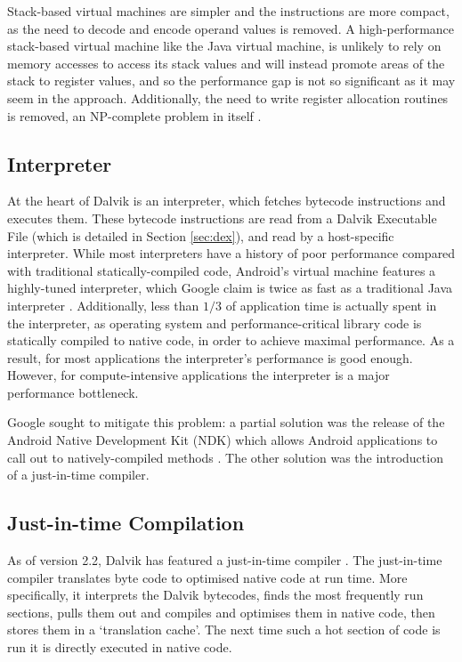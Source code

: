 Stack-based virtual machines are simpler and the instructions are more compact, as the need to decode and encode operand values is removed. A high-performance stack-based virtual machine like the Java virtual machine, is unlikely to rely on memory accesses to access its stack values and will instead promote areas of the stack to register values, and so the performance gap is not so significant as it may seem in the \naive approach. Additionally, the need to write register allocation routines is removed, an NP-complete problem in itself \cite{chaitin82}.

\subsection*{Interpreter}

At the heart of Dalvik is an interpreter, which fetches bytecode instructions and executes them. These bytecode instructions are read from a Dalvik Executable File (which is detailed in Section \ref{sec:dex}), and read by a host-specific interpreter. While most interpreters have a history of poor performance compared with traditional statically-compiled code, Android's virtual machine features a highly-tuned interpreter, which Google claim is twice as fast as a traditional Java interpreter \cite{android_22}. Additionally, less than $1/3$ of application time is actually spent in the interpreter, as operating system and performance-critical library code is statically compiled to native code, in order to achieve maximal performance. As a result, for most applications the interpreter's performance is good enough. However, for compute-intensive applications the interpreter is a major performance bottleneck.

Google sought to mitigate this problem: a partial solution was the release of the Android Native Development Kit (NDK) which allows Android applications to call out to natively-compiled methods \cite{android_22}. The other solution was the introduction of a just-in-time compiler.

\subsection*{Just-in-time Compilation}

As of version 2.2, Dalvik has featured a just-in-time compiler \cite{android_22}. The just-in-time compiler translates byte code to optimised native code at run time. More specifically, it interprets the Dalvik bytecodes, finds the most frequently run sections, pulls them out and compiles and optimises them in native code, then stores them in a `translation cache'. The next time such a hot section of code is run it is directly executed in native code.

